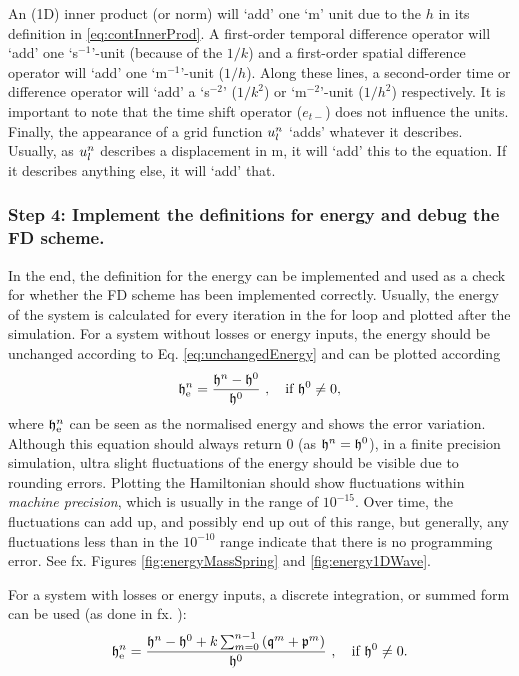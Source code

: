{{An (1D) inner product (or norm) will `add' one `m' unit due to the $h$ in its definition in \eqref{eq:contInnerProd}. A first-order temporal difference operator will `add' one `s$^{-1}$'-unit (because of the $1/k$) and a first-order spatial difference operator will `add' one `m$^{-1}$'-unit ($1/h$). Along these lines, a second-order time or difference operator will `add' a `s$^{-2}$' ($1/k^2$) or `m$^{-2}$'-unit ($1/h^2$) respectively. It is important to note that the time shift operator ($e_{t-}$) does not influence the units. Finally, the appearance of a grid function $u_l^n$ `adds' whatever it describes. Usually, as $u_l^n$ describes a displacement in m, it will `add' this to the equation. If it describes anything else, it will `add' that.

\subsubsection{Step 4: Implement the definitions for energy and debug the FD scheme.}
In the end, the definition for the energy can be implemented and used as a check for whether the FD scheme has been implemented correctly. Usually, the energy of the system is calculated for every iteration in the for loop and plotted after the simulation.
For a system without losses or energy inputs, the energy should be unchanged according to Eq. \eqref{eq:unchangedEnergy} and can be plotted according
% 
\begin{equation}\label{eq:normalisedEnergy}
    \mathfrak{h}_{\text{e}}^n = \frac{\mathfrak{h}^n - \mathfrak{h}^0}{\mathfrak{h}^0}\ ,\quad \text{if}\  \mathfrak{h}^0\neq 0,
\end{equation}
% 
where $\mathfrak{h}^n_\text{e}$ can be seen as the normalised energy and shows the error variation. 
Although this equation should always return $0$ (as $\mathfrak{h}^n = \mathfrak{h}^0$), in a finite precision simulation, ultra slight fluctuations of the energy should be visible due to rounding errors. Plotting the Hamiltonian should show fluctuations within \textit{machine precision}, which is usually in the range of $10^{-15}$. Over time, the fluctuations can add up, and possibly end up out of this range, but generally, any fluctuations less than in the $10^{-10}$ range indicate that there is no programming error. See fx. Figures \ref{fig:energyMassSpring} and \ref{fig:energy1DWave}.

For a system with losses or energy inputs, a discrete integration, or summed form can be used (as done in fx. \cite{Harrison2018}):
\begin{equation}\label{eq:normalisedEnergyDamping}
    \h_{\text{e}}^n = \frac{\h^n-\h^0 + k\sum_{m = 0}^{n-1} \left(\mathfrak{q}^m + \mathfrak{p}^m\right)}{\h^0}\ ,\quad \text{if}\ \h^0\neq 0.
\end{equation}

}}
